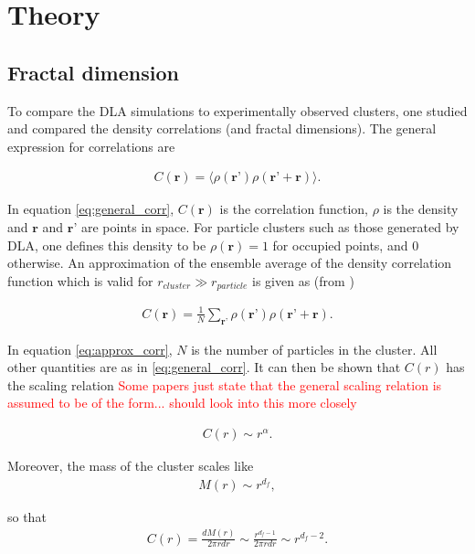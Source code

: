 \section{Theory}

\subsection{Fractal dimension}
To compare the DLA simulations to experimentally observed clusters, one studied and compared the density correlations (and fractal dimensions). The general expression for correlations are 

\begin{align}
C(\textbf{r}) = \langle \rho(\textbf{r'})\rho(\textbf{r'} +\textbf{r}) \rangle.
\label{eq:general_corr}
\end{align}

In equation \eqref{eq:general_corr}, $C(\textbf{r})$ is the correlation function, $\rho$ is the density and $\textbf{r}$ and $\textbf{r'}$ are points in space. For particle clusters such as those generated by DLA, one defines this density to be $\rho(\textbf{r}) = 1$ for occupied points, and $0$ otherwise. An approximation of the ensemble average of the density correlation function which is valid for $ r_{cluster} \gg r_{particle}$ is given  as (from \cite{PhysRevLett.47.1400})

\begin{align}
C(\textbf{r}) = \frac{1}{N}\sum_{\textbf{r'}}\rho(\textbf{r'})\rho(\textbf{r'} + \textbf{r}).
\label{eq:approx_corr}
\end{align} 

In equation \eqref{eq:approx_corr}, $N$ is the number of particles in the cluster. All other quantities are as in \eqref{eq:general_corr}. It can then be shown that $C(r)$ has the scaling relation \textcolor{red}{Some papers just state that the general scaling relation is assumed to be of the form... should look into this more closely}

\begin{align}
C(r) \sim r^{\alpha}.
\end{align}

Moreover, the mass of the cluster scales like
\begin{align}
M(r) \sim r^{d_f},
\end{align}

so that 
\begin{align}
C(r) = \frac{dM(r)}{2\pi r dr} \sim \frac{r^{d_f-1}}{2\pi r dr} \sim r^{d_f-2}.
\label{eq:d_f-2}
\end{align}

